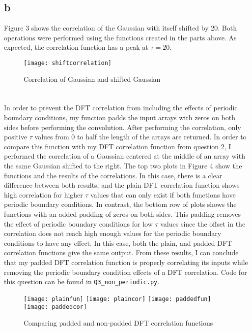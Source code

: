 \documentclass{article}
\newcommand{\<}[1]{\left\langle #1 \right\rangle }
\begin{document}
\subsection{b}
Figure 3 shows the correlation of the Gaussian with itself shifted by 20. Both operations were performed using the functions created in the parts above. As expected, the correlation function has a peak at $\tau=20$.
\begin{figure}[h]
	\caption{Correlation of Gaussian and shifted Gaussian}
	\centering
	\texttt{[image: shiftcorrelation]}
\end{figure}

\section{}
In order to prevent the DFT correlation from including the effects of periodic boundary conditions, my function padds the input arrays with zeros on both sides before performing the convolution. After performing the correlation, only positive $\tau$ values from 0 to half the length of the arrays are returned. In order to compare this function with my 
DFT correlation function from question 2, I performed the correlation of a Gaussian centered at the middle of an array with the same Gaussian shifted to the right. The top two plots in Figure 4 show the functions and the results of the correlations. In this case, there is a clear difference between both results, and the plain DFT correlation function shows high correlation for higher $\tau$ values that can only exist if both functions have periodic boundary conditions. In contrast, the bottom row of plots shows the functions with an added padding of zeros on both sides. This padding removes the effect of periodic boundary conditions for low $\tau$ values since the offset in the correlation does not reach high enough values for the periodic boundary conditions to have any effect. In this case, both the plain, and padded DFT correlation functions give the same output. From these results, I can conclude that my padded DFT correlation function is properly correlating its inputs while removing the periodic boundary condition effects of a DFT correlation. Code for this question can be found in \texttt{Q3\_non\_periodic.py}.
\begin{figure}[h]
	\caption{Comparing padded and non-padded DFT correlation functions}
	\centering
	\texttt{[image: plainfun]}
	\texttt{[image: plaincor]}
	\texttt{[image: paddedfun]}
	\texttt{[image: paddedcor]}
\end{figure}
  
\end{document}
